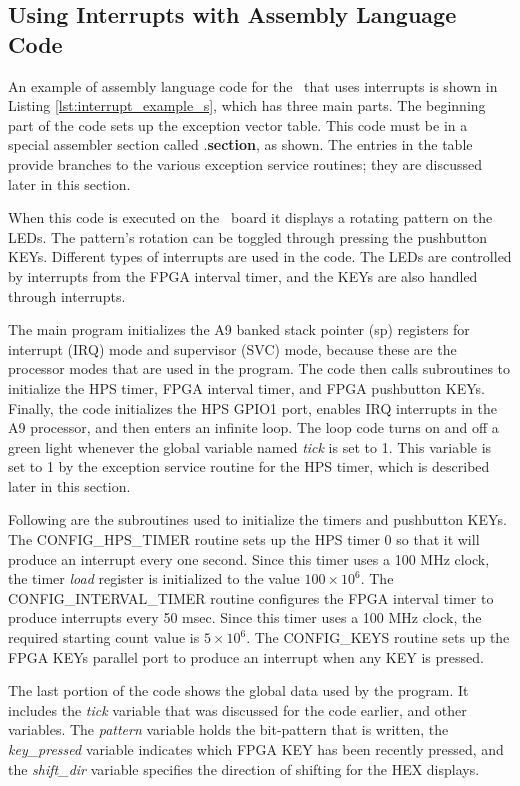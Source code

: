 \subsection{Using Interrupts with Assembly Language Code}

An example of assembly language code for the \systemName~that uses interrupts is
shown in Listing \ref{lst:interrupt_example_s}, which has three main parts. The beginning
part of the code 
sets up the exception vector table. This code must be in a special assembler section called
.{\bf section}, as shown.  The entries in the table provide branches
to the various exception service routines; they are discussed later in this section.

When this code is executed on the \DEBoard~board
it displays a rotating pattern on the LEDs. The pattern's rotation can be toggled through pressing the pushbutton KEYs.
Different types of interrupts are used in the code. The LEDs are controlled by interrupts from the FPGA
interval timer, and the KEYs are also handled through interrupts.

The main program initializes the A9 banked stack pointer (sp) registers for interrupt (IRQ) mode 
and supervisor (SVC) mode, because these are the processor modes that are
used in the program. The code then calls subroutines to initialize the HPS timer, FPGA
interval timer, and FPGA pushbutton KEYs. Finally, the code initializes the HPS GPIO1
port, enables IRQ interrupts in the A9 processor, and then enters an infinite loop. 
The loop code turns on and off a green light whenever 
the global variable named {\it tick} is set to 1. This variable is set to 1 by the 
exception service routine for the HPS timer, which is described later in this section.

Following are the subroutines used to initialize the timers and 
pushbutton KEYs.  The CONFIG\_HPS\_TIMER routine sets up the HPS timer 0 so that it will produce an
interrupt every one second. Since this timer uses a 100 MHz clock, the timer {\it load} register
is initialized to the value $100 \times 10^6$. The CONFIG\_INTERVAL\_TIMER routine
configures the FPGA interval timer to produce interrupts every 50 msec. Since this timer
uses a 100 MHz clock, the required starting count value is $5 \times 10^6$. The
CONFIG\_KEYS routine sets up the FPGA KEYs parallel port to produce an interrupt when any
KEY is pressed.

The last portion of the code shows the global data used by the program.
It includes the {\it tick} variable that was discussed for the code earlier, and other variables. 
The {\it pattern} variable holds the bit-pattern that is written, the {\it key\_pressed} variable indicates which FPGA KEY has been recently pressed, and
the {\it shift\_dir} variable specifies the direction of shifting for the HEX displays.

